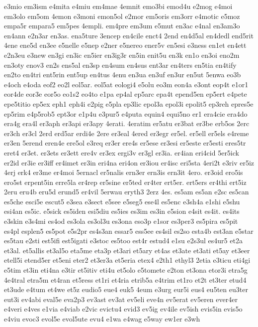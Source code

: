 {e3mio
em3ism
e4mita
e4miu
em4mae
4emnit
emo3bi
emod4u
e2mog
e4moi
em3olo
em5om
4emon
e3moni
emon5ol
e2mor
em5oris
em3orr
e4motic
e5moz
empa5r
empara5
em5pes
4empli.
em4pre
em3um
e5mut
en3ac
e4nal
en3am3o
en4ann
e2n3ar
en3as.
ena5ture
3encep
en4cile
enct4
2end
en4d5al
en4dedl
end5rit
4ene
ene5d
en3ee
e5nelle
e5nep
e2ner
e5nereo
ener5v
en5esi
e3ness
en1et
en4ett
e2n3eu
e3new
en3gi
en3ic
en5ier
en3ig3r
en5in
enit5u
en3k
en1o
en3oi
eno2m
en3oty
enov3
en2s
ens5al
en3sp
en4sum
en4sus
ent3ar
en4ters
en5tia
en4tify
en2to
en4tri
ent5rin
ent5up
en4tus
4enu
en3ua
en3uf
en3ur
en5ut
5enwa
eo3b
e4och
e4oda
eof2
eo2l
eol5ar.
eol5at
eologi4
e5olu
eo3m
eon4a
e3ont
eop4t
e1or1
eor4de
eor3e
eor5o
eo1s2
eo4to
e1pa
ep4al
ep5arc
epa4t
epend5en
ep5ert
e4pete
epe5titio
ep5ex
eph1
eph4i
e2pig
e5pla
ep3lic
epol3a
epol3i
epolit5
ep3reh
epres5e
ep5rim
e4p5rob5
ept3or
e1p4u
e3pur5
e4puta
equin4
equi5no
er1
era4cie
era4do
era4g
era4l
er3aph
er3api
er3apy
4erati.
4eratim
er5atu
er3bat
er3be
erb5os
2erc
er3ch
er3cl
2erd
erd5ar
erdi4e
2ere
er3eal
4ered
er3egr
er5el.
er5ell
er5els
e4reme
er3en
5erend
eren4e
ere5ol
e3req
er3er
ere4s
er5ese
er3esi
er5este
er5esti
eres5tr
eret4
er3et.
er3ets
er3ett
ere4v
er3ex
ergi3v
er3gl
er3ia.
er4ian
eri4cid
5er5ick
er2id
er3ie
er3iff
er4imet
er3in
eri4na
eri4on
er3iou
er4isc
eri5sta
4eri2t
e3riv
er5iz
4erj
erk4
er3me
er4moi
5ernacl
er5nalis
ern3er
ern3is
ern3it
4ero.
er3oid
ero5is
ero5st
erpent5in
erre5la
er4rep
er5sine
er5ted
er4ter
ert5er.
ert5ers
er4thi
ert5iz
2eru
eru4b
eru5d
erund5
er4vil
5erwau
eryth3
2erz
4es.
es5am
es5an
e2sc
es5can
es5che
esci5e
escut5
e3sea
e3sect
e5see
e5seg5
ese4l
es5enc
e3sh4a
e1shi
e5shu
esi4an
es5ic.
e5sick
es5iden
esi5diu
es5ies
es3im
es3in
e5sion
e4sit
es4it.
es4its
e3skin
e3s4mi
es4od
es3ola
es3ol3u
es3ona
eso3p
e1sor
es3per3
es5pira
es5pit
es4pl
esplen5
es5pot
e5s2pr
es4s3an
essar5
ess5ee
es4sil
es2so
esta4b
est3an
e5star
es5tau
e2sti
est5ifi
est5igati
e3stoc
es5too
est4r
estud4
e1su
e2s3ul
es4ur5
et2a
et3al.
et5allis
et3al5o
eta5me
eta3p
et3ari
et5ary
et4as
et3ate
et3ati
et5ay
et3eer
etell5i
etend5er
et5eni
eter2
et3er3a
et5eria
etex4
e2th1
ethyl3
2etia
e3ticu
eti4gi
e5tim
et3in
eti4na
e3tir
et5itiv
eti4u
et5olo
e5tomete
e2ton
et3ona
etor3i
etra5g
4e4tral
etra5m
et4ran
et5ress
et1ri
et4ria
etrib5a
e4trim
et1ro
et2t
et3ter
etud4
et3ude
e4tum
et4we
et5z
eudio5
eue4
euk5
4eum
e3urg
eur5i
eus4
eu5ten
eu3ter
eut3i
ev4abi
eval5e
eva2p3
ev3ast
ev3at
ev5eli
eve4n
ev5erat
ev5eren
ever4er
e4veri
e4ves
e1via
e4viab
e2vic
evictu4
evid3
ev5ig
ev4ile
ev5ish
evis5in
evis5o
e4viu
evoc3
evol5e
evol5ute
evu4
e1wa
e4wag
e5way
ew1er
e3wh
}
